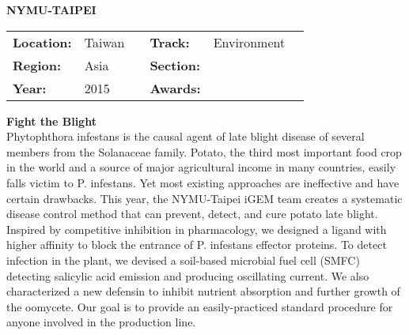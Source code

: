 \textbf{\uppercase{NYMU-Taipei}}
\FloatBarrier
\begin{table}[h]
\begin{tabular}{lp{2.5cm}llll}
\textbf{Location:} & Taiwan & \multicolumn{1}{|l}{} & \textbf{Track:}   & Environment \\
\textbf{Region:}   & Asia   & \multicolumn{1}{|l}{} & \textbf{Section:} &  \\
\textbf{Year:}     & 2015   & \multicolumn{1}{|l}{} & \textbf{Awards:}  &
\end{tabular}
\end{table}
\FloatBarrier
\noindent	\textbf{Fight the Blight} \vspace{.2cm}\\
Phytophthora infestans is the causal agent of late blight disease of several members from the Solanaceae family. Potato, the third most important food crop in the world and a source of major agricultural income in many countries, easily falls victim to P. infestans. Yet most existing approaches are ineffective and have certain drawbacks. This year, the NYMU-Taipei iGEM team creates a systematic disease control method that can prevent, detect, and cure potato late blight. Inspired by competitive inhibition in pharmacology, we designed a ligand with higher affinity to block the entrance of P. infestans effector proteins. To detect infection in the plant, we devised a soil-based microbial fuel cell (SMFC) detecting salicylic acid emission and producing oscillating current. We also characterized a new defensin to inhibit nutrient absorption and further growth of the oomycete. Our goal is to provide an easily-practiced standard procedure for anyone involved in the production line.
\vspace{2cm} $ $
\pagebreak


